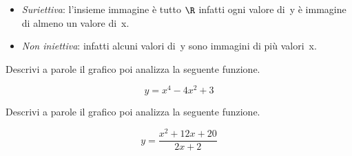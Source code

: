 \begin{itemize} [nosep]
 \item \emph{Suriettiva}: l'insieme immagine è tutto \(\R\) infatti ogni 
valore di~y è immagine di almeno un valore di~x.
 \item \emph{Non iniettiva}: infatti alcuni valori di~y sono immagini di più 
valori~x.
\end{itemize}


\begin{esempio}
 Descrivi a parole il grafico poi analizza la seguente funzione.
\begin{minipage}{.20\linewidth}
 \begin{center}
\[y=x^4-4x^2+3\]
 \end{center}
\end{minipage}
\hfill
\begin{minipage}{.80\linewidth}
 \begin{center}
\funzioneb
 \end{center}
\end{minipage}

\end{esempio}

\newpage

\begin{esempio}
 Descrivi a parole il grafico poi analizza la seguente funzione.
 
\begin{minipage}{.20\linewidth}
 \begin{center}
\[y=\frac{x^2+12x+20}{2x+2}\]
 \end{center}
\end{minipage}
\hfill
\begin{minipage}{.80\linewidth}
 \begin{center}
\funzionec
 \end{center}
\end{minipage}

\end{esempio}

